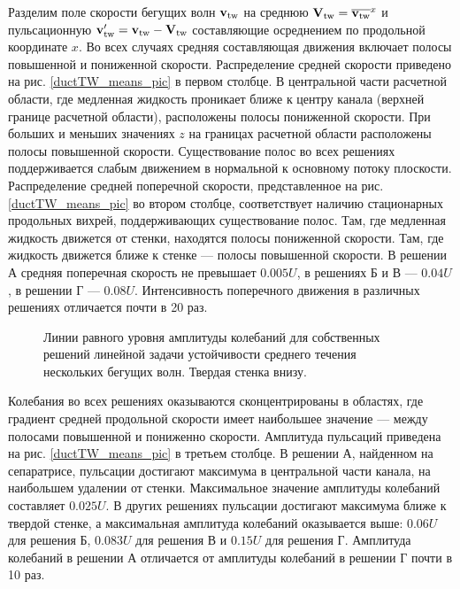 Разделим поле скорости бегущих волн $\mathbf{v}_\mathrm{tw}$ на среднюю $\mathbf{V}_\mathrm{tw} = \overline{\mathbf{v}_\mathrm{tw}}^x$ и пульсационную $\mathbf{v}'_\mathrm{tw} = \mathbf{v}_\mathrm{tw} - \mathbf{V}_\mathrm{tw}$ составляющие осреднением по продольной координате $x$. Во всех случаях средняя составляющая движения включает полосы повышенной и пониженной скорости. Распределение средней скорости приведено на рис. \ref{ductTW_means_pic} в первом столбце. В центральной части расчетной области, где медленная жидкость проникает ближе к центру канала (верхней границе расчетной области), расположены полосы пониженной скорости. При больших и меньших значениях $z$ на границах расчетной области расположены полосы повышенной скорости. Существование полос во всех решениях поддерживается слабым движением в нормальной к основному потоку плоскости. Распределение средней поперечной скорости, представленное на рис. \ref{ductTW_means_pic} во втором столбце, соответствует наличию стационарных продольных вихрей, поддерживающих существование полос. Там, где медленная жидкость движется от стенки, находятся полосы пониженной скорости. Там, где жидкость движется ближе к стенке --- полосы повышенной скорости. В решении А средняя поперечная скорость не превышает $0.005U$, в решениях Б и В --- $0.04U$, в решении Г --- $0.08U$. Интенсивность поперечного движения в различных решениях отличается почти в 20 раз. 

\begin{figure}
\caption{Линии равного уровня амплитуды колебаний для собственных решений линейной задачи устойчивости среднего течения нескольких бегущих волн. Твердая стенка внизу.} 
\label{ductTW_lin_pic}
\end{figure}

Колебания во всех решениях оказываются сконцентрированы в областях, где градиент средней продольной скорости имеет наибольшее значение --- между полосами повышенной и пониженно скорости. Амплитуда пульсаций приведена на рис. \ref{ductTW_means_pic} в третьем столбце. В решении А, найденном на сепаратрисе, пульсации достигают максимума в центральной части канала, на наибольшем удалении от стенки. Максимальное значение амплитуды колебаний составляет $0.025U$. В других решениях пульсации достигают максимума ближе к твердой стенке, а максимальная амплитуда колебаний оказывается выше: $0.06U$ для решения Б, $0.083U$ для решения В и $0.15U$ для решения Г. Амплитуда колебаний в решении А отличается от амплитуды колебаний в решении Г почти в 10 раз. 

